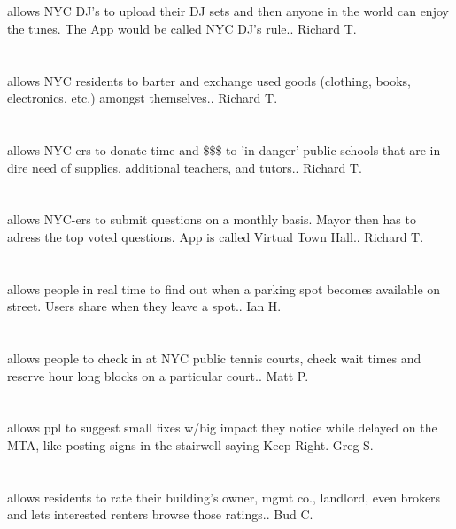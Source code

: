 \section{}allows NYC DJ's to upload their DJ sets and then anyone in the world can enjoy the tunes. The App would be called NYC DJ's rule.. Richard T.
\section{}allows NYC residents to barter and exchange used goods (clothing,  books,  electronics,  etc.) amongst themselves.. Richard T.
\section{}allows NYC-ers to donate time and \$\$\$ to 'in-danger' public schools that are in dire need of supplies,  additional teachers,  and tutors.. Richard T.
\section{}allows NYC-ers to submit questions on a monthly basis. Mayor then has to adress the top voted questions. App is called Virtual Town Hall.. Richard T.
\section{}allows people in real time to find out when a parking spot becomes available on street. Users share when they leave a spot.. Ian H.
\section{}allows people to check in at NYC public tennis courts,  check wait times and reserve hour long blocks on a particular court.. Matt P.
\section{}allows ppl to suggest small fixes w/big impact they notice while delayed on the MTA,  like posting signs in the stairwell saying Keep Right. Greg S.
\section{}allows residents to rate their building's owner,  mgmt co.,  landlord,  even brokers and lets interested renters browse those ratings.. Bud C.

